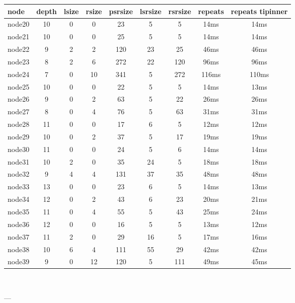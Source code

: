 \begin{tabular}{|l|c|c|c|c|c|c|c|c|}
\hline node & depth & lsize & rsize & psrsize & lsrsize & rsrsize   & repeats & repeats tipinner\\
    \hline node20 & 10 & 0 & 0 & 23 & 5 & 5 & 14ms & 14ms\\
    \hline node21 & 10 & 0 & 0 & 25 & 5 & 5 & 14ms & 14ms\\
    \hline node22 & 9 & 2 & 2 & 120 & 23 & 25 & 46ms & 46ms\\
    \hline node23 & 8 & 2 & 6 & 272 & 22 & 120 & 96ms & 96ms\\
    \hline node24 & 7 & 0 & 10 & 341 & 5 & 272 & 116ms & 110ms\\
    \hline node25 & 10 & 0 & 0 & 22 & 5 & 5 & 14ms & 13ms\\
    \hline node26 & 9 & 0 & 2 & 63 & 5 & 22 & 26ms & 26ms\\
    \hline node27 & 8 & 0 & 4 & 76 & 5 & 63 & 31ms & 31ms\\
    \hline node28 & 11 & 0 & 0 & 17 & 6 & 5 & 12ms & 12ms\\
    \hline node29 & 10 & 0 & 2 & 37 & 5 & 17 & 19ms & 19ms\\
    \hline node30 & 11 & 0 & 0 & 24 & 5 & 6 & 14ms & 14ms\\
    \hline node31 & 10 & 2 & 0 & 35 & 24 & 5 & 18ms & 18ms\\
    \hline node32 & 9 & 4 & 4 & 131 & 37 & 35 & 48ms & 48ms\\
    \hline node33 & 13 & 0 & 0 & 23 & 6 & 5 & 14ms & 13ms\\
    \hline node34 & 12 & 0 & 2 & 43 & 6 & 23 & 20ms & 21ms\\
    \hline node35 & 11 & 0 & 4 & 55 & 5 & 43 & 25ms & 24ms\\
    \hline node36 & 12 & 0 & 0 & 16 & 5 & 5 & 13ms & 12ms\\
    \hline node37 & 11 & 2 & 0 & 29 & 16 & 5 & 17ms & 16ms\\
    \hline node38 & 10 & 6 & 4 & 111 & 55 & 29 & 42ms & 42ms\\
    \hline node39 & 9 & 0 & 12 & 120 & 5 & 111 & 49ms & 45ms\\

\hline
\end{tabular} \

---



